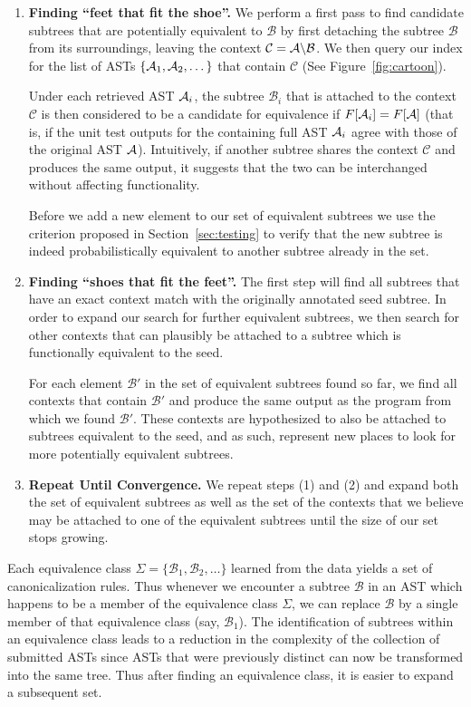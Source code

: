 \begin{enumerate}
\item {\bf Finding ``feet that fit the shoe''.}
 We perform a first pass to find candidate subtrees that are potentially equivalent to $\mathcal{B}$
by first detaching the subtree $\mathcal{B}$ from its surroundings, leaving the context $\mathcal{C} = \mathcal{A}\backslash\mathcal{B}$.
We then query our index for the list of ASTs $\{\mathcal{A}_1,\mathcal{A}_2,\dots\}$ that contain $\mathcal{C}$ (See Figure~\ref{fig:cartoon}).

Under each retrieved AST $\mathcal{A}_i$, the subtree $\mathcal{B}_i$ that is attached to the context $\mathcal{C}$ is
then considered to be a candidate for equivalence if $F[\mathcal{A}_i] = F[\mathcal{A}]$ (that is, if
the unit test outputs for the containing full AST $\mathcal{A}_i$ agree with those of the original AST $\mathcal{A}$). Intuitively, if another subtree shares the context $\mathcal{C}$ and 
produces the same output, it suggests that the two can be interchanged without affecting  functionality.

Before we add a new element to our set of equivalent subtrees 
we use the criterion proposed in Section~\ref{sec:testing} to verify that the new subtree is indeed
probabilistically equivalent to another subtree already in the set.
\item {\bf Finding ``shoes that fit the feet''.}
The first step will find all subtrees that have an exact context match with the originally annotated seed subtree. In order to expand our search for further equivalent subtrees, 
we then search for other contexts that can plausibly be attached to a subtree which is functionally equivalent to the seed. 

For each element $\mathcal{B}'$ in the set of equivalent subtrees found so far, we find all 
contexts that contain  $\mathcal{B}'$ and produce the same output as the program from 
which we found $\mathcal{B}'$. These contexts are hypothesized to also be attached to subtrees equivalent to the seed, 
and as such, represent new places to look for more potentially equivalent subtrees.
 
\item {\bf Repeat Until Convergence.}
We repeat steps (1) and (2) and expand both the set of equivalent subtrees as well as the
set of the contexts that we believe may be attached to one of the equivalent subtrees 
until the size of our set stops growing.
\end{enumerate}

Each equivalence class
$\Sigma=\{\mathcal{B}_1,\mathcal{B}_2,\dots\}$ 
learned from the data yields a set of canonicalization rules.  Thus whenever
we encounter a subtree $\mathcal{B}$ in an AST which happens to be a member of the equivalence class
$\Sigma$, we can replace $\mathcal{B}$ by a single member of that equivalence class (say, $\mathcal{B}_1$).
The identification of subtrees within an equivalence class
 leads to a reduction in the complexity of the collection of submitted ASTs since ASTs that were previously
distinct can now be transformed into the same tree.  Thus after finding an equivalence class, it is easier to expand a subsequent set.

